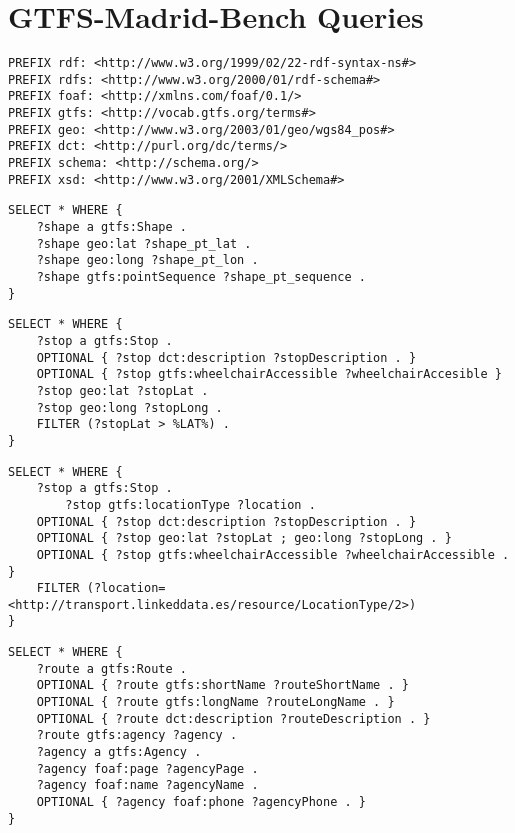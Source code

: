 \chapter{GTFS-Madrid-Bench Queries}
\label{sec:appendix1}

\begin{lstlisting}[caption=Prefixes, label=lst:prefixes, basicstyle=\ttfamily,frame=single]
PREFIX rdf: <http://www.w3.org/1999/02/22-rdf-syntax-ns#>
PREFIX rdfs: <http://www.w3.org/2000/01/rdf-schema#>
PREFIX foaf: <http://xmlns.com/foaf/0.1/>
PREFIX gtfs: <http://vocab.gtfs.org/terms#>
PREFIX geo: <http://www.w3.org/2003/01/geo/wgs84_pos#>
PREFIX dct: <http://purl.org/dc/terms/>
PREFIX schema: <http://schema.org/>
PREFIX xsd: <http://www.w3.org/2001/XMLSchema#>
\end{lstlisting}

\begin{lstlisting}[caption=Query 1 - List all shapes with some of their data, label=lst:sparql1, basicstyle=\ttfamily,frame=single]
SELECT * WHERE {
	?shape a gtfs:Shape .
	?shape geo:lat ?shape_pt_lat .
	?shape geo:long ?shape_pt_lon .
	?shape gtfs:pointSequence ?shape_pt_sequence .
}
\end{lstlisting}

\begin{lstlisting}[caption={Query 2 - List all stops with some of their data including geographic coordinates, where the latitude is bigger than its mean}, label=lst:sparql2, basicstyle=\ttfamily,frame=single]
SELECT * WHERE {
	?stop a gtfs:Stop . 
	OPTIONAL { ?stop dct:description ?stopDescription . }
	OPTIONAL { ?stop gtfs:wheelchairAccessible ?wheelchairAccesible }
	?stop geo:lat ?stopLat . 
	?stop geo:long ?stopLong .
	FILTER (?stopLat > %LAT%) .		
}
\end{lstlisting}

\begin{lstlisting}[caption={Query 3 - Find the accessibility information for the stations, if available}, label=lst:sparql3, basicstyle=\ttfamily,frame=single]
SELECT * WHERE {
	?stop a gtfs:Stop . 
        ?stop gtfs:locationType ?location .
	OPTIONAL { ?stop dct:description ?stopDescription . }
	OPTIONAL { ?stop geo:lat ?stopLat ; geo:long ?stopLong . }
	OPTIONAL { ?stop gtfs:wheelchairAccessible ?wheelchairAccessible .  }
	FILTER (?location=<http://transport.linkeddata.es/resource/LocationType/2>)
}
\end{lstlisting}

\begin{lstlisting}[caption=Query 4 - List all agencies and their routes with some of their data, label=lst:sparql4, basicstyle=\ttfamily,frame=single]
SELECT * WHERE {
	?route a gtfs:Route .
	OPTIONAL { ?route gtfs:shortName ?routeShortName . }
	OPTIONAL { ?route gtfs:longName ?routeLongName . } 
	OPTIONAL { ?route dct:description ?routeDescription . } 
	?route gtfs:agency ?agency .
	?agency a gtfs:Agency .
	?agency foaf:page ?agencyPage .
	?agency foaf:name ?agencyName .
	OPTIONAL { ?agency foaf:phone ?agencyPhone . }
}
\end{lstlisting}

